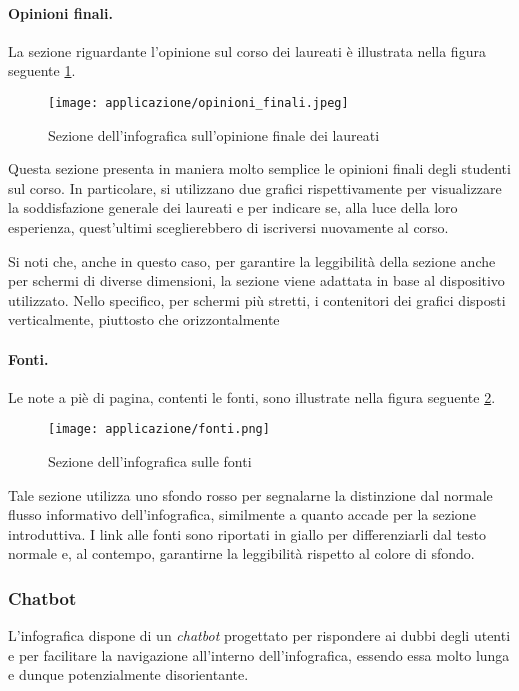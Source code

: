 \paragraph{Opinioni finali.} La sezione riguardante l'opinione sul corso dei laureati è illustrata nella figura seguente \ref{fig:app_opinioni_finali}. 
\begin{figure}[H] 
    \centering 
    \texttt{[image: applicazione/opinioni\_finali.jpeg]} 
    \caption{Sezione dell'infografica sull'opinione finale dei laureati}
    \label{fig:app_opinioni_finali}
\end{figure}
Questa sezione presenta in maniera molto semplice le opinioni finali degli studenti sul corso. In particolare, si utilizzano due grafici rispettivamente per visualizzare la soddisfazione 
generale dei laureati e per indicare se, alla luce della loro esperienza, quest'ultimi sceglierebbero di iscriversi nuovamente al corso.

\bigskip
\noindent Si noti che, anche in questo caso, per garantire la leggibilità della sezione anche per schermi di diverse dimensioni, la sezione viene adattata 
in base al dispositivo utilizzato. Nello specifico, per schermi più stretti, i contenitori dei grafici disposti verticalmente, piuttosto che orizzontalmente

\paragraph{Fonti.} Le note a piè di pagina, contenti le fonti, sono illustrate nella figura seguente \ref{fig:app_fonti}. 
\begin{figure}[H] 
    \centering 
    \texttt{[image: applicazione/fonti.png]} 
    \caption{Sezione dell'infografica sulle fonti}
    \label{fig:app_fonti}
\end{figure}
Tale sezione utilizza uno sfondo rosso per segnalarne la distinzione dal normale flusso informativo dell'infografica, similmente a quanto accade per la sezione introduttiva. 
I link alle fonti sono riportati in giallo per differenziarli dal testo normale e, al contempo, garantirne la leggibilità rispetto al colore di sfondo.

\subsubsection{Chatbot}\label{subsubsec:chatbot}
L'infografica dispone di un \emph{chatbot} progettato per rispondere ai dubbi degli utenti e per facilitare la navigazione all'interno dell'infografica, 
essendo essa molto lunga e dunque potenzialmente disorientante.

